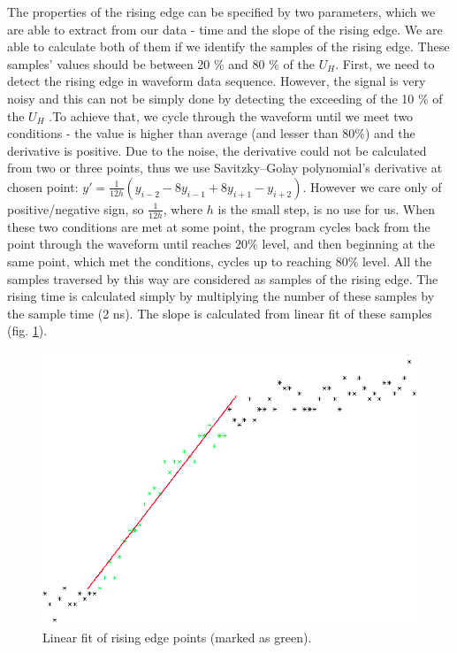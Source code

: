 \par
The properties of the rising edge can be specified by two parameters, which we are able to extract from our data - time and the slope of the rising edge. We are able to calculate both of them if we identify the samples of the rising edge. These samples' values should be between 20 $\%$ and 80 $\%$ of the $U_{H}$. First, we need to detect the rising edge in waveform data sequence. However, the signal is very noisy and this can not be simply done by detecting the exceeding of the 10 $\%$ of the $U_{H}$ .To achieve that, we cycle through the waveform until we meet two conditions - the value is higher than average (and lesser than $80 \%$) and the derivative is positive. Due to the noise, the derivative could not be calculated from two or three points, thus we use Savitzky–Golay polynomial's derivative at chosen point: $y' = \frac{1}{12h}(y_{i-2} -8y_{i-1} + 8y_{i+1} - y_{i+2}) $. However we care only of positive/negative sign, so $\frac{1}{12h}$, where $h$ is the small step, is no use for us. When these two conditions are met at some point, the program cycles back from the point through the waveform until reaches $20\%$ level, and then beginning at the same point, which met the conditions, cycles up to reaching $80\%$ level. All the samples traversed by this way are considered as samples of the rising edge. The rising time is calculated simply by multiplying the number of these samples by the sample time (2 ns). The slope is calculated from linear fit of these samples (fig. \ref{linfit}).  


 \begin{figure}[H]
 \centering
 \includegraphics[scale=0.35]{./pictures/linFit}
 \caption{Linear fit of rising edge points (marked as green).}
 \label{linfit}
\end{figure}


